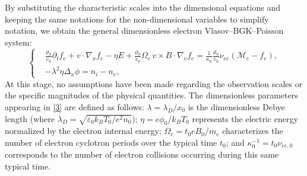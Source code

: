 \documentclass[pdflatex,final,10pt]{article}
\newcommand{\Fabrice}[1]{#1}
\begin{document}
By substituting the characteristic scales into the dimensional equations and keeping the same notations for the non-dimensional variables to simplify notation, we obtain the general dimensionless electron Vlasov--BGK--Poisson system:
\begin{equation} \label{3}
    \left \{
    \begin{aligned}
        &\frac{\vartheta_0}{v_0}\partial_{t}f_e + v\cdot\nabla_{x}f_e - \eta E + \frac{\vartheta_0}{v_0} \Omega_e  \, v\times B \cdot \nabla_{v}f_e = \frac{1}{\kappa_0} \frac{\vartheta_0}{v_0} \nu_{ee} \left(\mathcal{M}_{e}-f_e \right), \\
        &-\lambda^{2}\eta\Delta_x\phi = n_{i}-n_e,
    \end{aligned}
    \right.
\end{equation}
  \Fabrice{At this stage, no assumptions have been made regarding the observation scales or the specific magnitudes of the physical quantities. The dimensionless parameters appearing in \eqref{3} are defined as follows: $\lambda = \lambda_D / x_0$ is the dimensionless Debye length (where $\lambda_D = \sqrt{\varepsilon_0 k_B T_0 / e^2 n_0}$); $\eta = e\phi_0 / k_B T_0$ represents the electric energy normalized by the electron internal energy; $\Omega_e = t_0 e B_0 / m_e$ characterizes the number of electron cyclotron periods over the typical time $t_0$; and $\kappa_0^{-1} = t_0 \nu_{ee,0}$ corresponds to the number of electron collisions occurring during this same typical time.}
\end{document}
